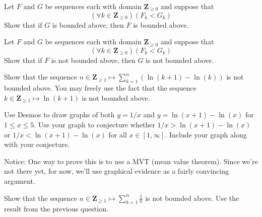 \documentclass[12pt,fleqn]{exam}
\newcommand{\integers}{\mathbf{Z}}
\begin{document}
\begin{questions}


\question [10] Let $F$ and $G$ be sequences each with
domain $\integers_{\geq 0}$ and suppose that 
\begin{equation*}
     \left(\forall k \in \integers_{\geq 0}\right) \left(F_k < G_k\right)
\end{equation*}
Show that if $G$ is bounded above, then $F$ is bounded above.

\begin{solution}

    
\end{solution}

\question [10] Let $F$ and $G$ be sequences each with
domain $\integers_{\geq 0}$ and suppose that 
\begin{equation*}
     \left(\forall k \in \integers_{\geq 0}\right) \left(F_k < G_k\right)
\end{equation*}
Show that if $F$ is not bounded above, then $G$ is not bounded above.

\begin{solution}
\end{solution}
 \question [10] Show that the sequence $n \in \integers_{\geq 1} \mapsto 
 \sum_{k=1}^n \left(\ln(k+1) - \ln(k)\right)$ is not bounded above.
You may freely use the fact that the sequence $k \in \integers_{\geq 1} \mapsto \ln(k+1)$
is not bounded above.
\begin{solution}
\end{solution}
\question[10] Use Desmos to draw  graphs of both $y=1/x$ and $y = \ln(x+1) - \ln(x)$ for 
$1 \leq x \leq 5$. Use your graph to conjecture whether $1/x > \ln(x+1) - \ln(x)$
or $1/x < \ln(x+1) - \ln(x)$ for all $x \in [1, \infty]$. Include
your graph along with your conjecture.

Notice: One way to prove this is to use a MVT (mean value theorem). 
Since we're not there yet, for now, we'll use graphical evidence as 
a fairly convincing argument.

\begin{solution}
\end{solution}

\question[10] Show that the sequence 
$n \in \integers_{\geq 1} \mapsto 
\sum_{k=1}^n \frac{1}{k}$ is not bounded above. Use the result from 
the previous question.


\end{questions}
\end{document}
